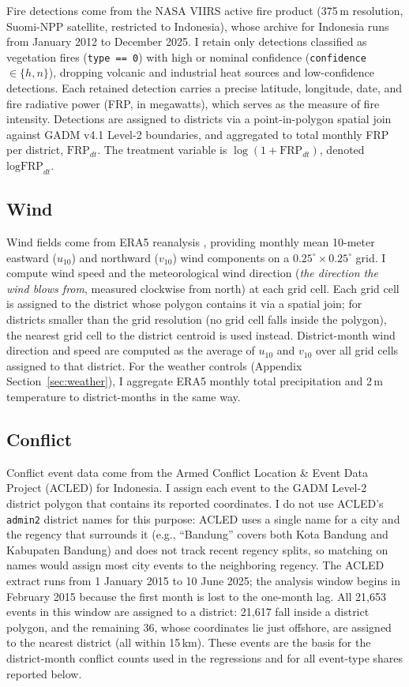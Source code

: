 \documentclass[12pt]{article}
\begin{document}
Fire detections come from the NASA VIIRS active fire product (375\,m resolution, Suomi-NPP satellite, restricted to Indonesia), whose archive for Indonesia runs from January 2012 to December 2025. I retain only detections classified as vegetation fires (\texttt{type == 0}) with high or nominal confidence (\texttt{confidence} $\in \{h, n\}$), dropping volcanic and industrial heat sources and low-confidence detections. Each retained detection carries a precise latitude, longitude, date, and fire radiative power (FRP, in megawatts), which serves as the measure of fire intensity. Detections are assigned to districts via a point-in-polygon spatial join against GADM v4.1 Level-2 boundaries, and aggregated to total monthly FRP per district, $\text{FRP}_{dt}$. The treatment variable is $\log(1+\text{FRP}_{dt})$, denoted $\text{logFRP}_{dt}$.

\subsection{Wind}

Wind fields come from ERA5 reanalysis \citep{hersbach2023era5}, providing monthly mean 10-meter eastward ($u_{10}$) and northward ($v_{10}$) wind components on a $0.25^{\circ}\times0.25^{\circ}$ grid. I compute wind speed and the meteorological wind direction (\emph{the direction the wind blows from}, measured clockwise from north) at each grid cell. Each grid cell is assigned to the district whose polygon contains it via a spatial join; for districts smaller than the grid resolution (no grid cell falls inside the polygon), the nearest grid cell to the district centroid is used instead. District-month wind direction and speed are computed as the average of $u_{10}$ and $v_{10}$ over all grid cells assigned to that district. For the weather controls (Appendix Section~\ref{sec:weather}), I aggregate ERA5 monthly total precipitation and 2\,m temperature to district-months in the same way.

\subsection{Conflict}

Conflict event data come from the Armed Conflict Location \& Event Data Project (ACLED) for Indonesia. I assign each event to the GADM Level-2 district polygon that contains its reported coordinates. I do not use ACLED's \texttt{admin2} district names for this purpose: ACLED uses a single name for a city and the regency that surrounds it (e.g., ``Bandung'' covers both Kota Bandung and Kabupaten Bandung) and does not track recent regency splits, so matching on names would assign most city events to the neighboring regency. The ACLED extract runs from 1 January 2015 to 10 June 2025; the analysis window begins in February 2015 because the first month is lost to the one-month lag. All 21{,}653 events in this window are assigned to a district: 21{,}617 fall inside a district polygon, and the remaining 36, whose coordinates lie just offshore, are assigned to the nearest district (all within 15\,km). These events are the basis for the district-month conflict counts used in the regressions and for all event-type shares reported below.
\end{document}
